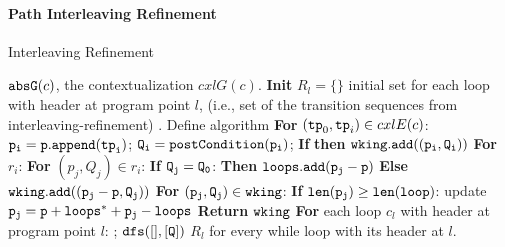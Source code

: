 \paragraph{Path Interleaving Refinement}
\begin{algorithm}
  \caption{
  {Interleaving Refinement}
  \label{alg:prog-refine}
  }
  \begin{algorithmic}[1]
  \REQUIRE $\mathtt{abs}{\mathtt{G}}(c)$, the contextualization $cxlG(c)$.
  \STATE  \textbf{Init} 
  $R_l = \{\}$ initial set for each loop with header at program point $l$, (i.e., set of the transition sequences from interleaving-refinement) .
  \STATE Define algorithm 
  \STATE {}
  \STATE \quad \textbf{For} $(\mathtt{tp}_0, \mathtt{tp}_i) \in cxlE(c)$:
  \\
  \STATE \quad \quad $\mathtt{p_i = p.append(\mathtt{tp}_i)}$; $\mathtt{Q_i = postCondition(p_i)}$; 
  \STATE \quad \quad \textbf{If} 
  \STATE \quad \quad \textbf{then} $\mathtt{wking.add( (p_i, Q_i) )}$
  \STATE \quad \quad  {}
  \STATE \quad \textbf{For} $r_i$:
  \STATE \quad \quad \textbf{For} $(p_j, Q_j) \in r_i$:
  \STATE \quad \quad \quad \textbf{If} $\mathtt{Q_j = Q_0}$: 
  \STATE \quad \quad \quad \textbf{Then} $\mathtt{loops.add(p_j-p)}$
  \STATE \quad \quad \quad \textbf{Else} $\mathtt{wking.add( (p_j - p, Q_j) )}$
  \STATE \quad \textbf{For} $\mathtt{(p_j, Q_j) \in wking}$:
  \STATE \quad \quad \textbf{If} $\mathtt{len(p_j) \geq len(loop)}$:  update $\mathtt{p_j = p + loops^* + p_j - loops}$
  \STATE \quad \textbf{Return} $\mathtt{wking}$
  \STATE \textbf{For} each loop $c_{l}$ with header at program point $l$:
    \STATE \quad {}; $\mathtt{dfs([], [Q] )}$
  \RETURN $R_l$ for every while loop with its header at $l$.
  \end{algorithmic}
  \end{algorithm}